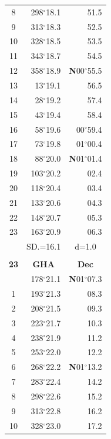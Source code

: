 \documentclass[10pt, a4paper]{report}
\begin{document}
\begin{scriptsize}
\begin{tabular*}{0.2\textwidth}[t]{@{\extracolsep{\fill}}|c|rr|}
8 & 298$^\circ$18.1 & 51.5\\
9 & 313$^\circ$18.3 & \raisebox{0.24ex}{\boldmath$\cdot$~\boldmath$\cdot$~~}52.5\\
10 & 328$^\circ$18.5 & 53.5\\
11 & 343$^\circ$18.7 & 54.5\\[2Pt]
12 & 358$^\circ$18.9 & \textbf{N}00$^\circ$55.5\\
13 & 13$^\circ$19.1 & 56.5\\
14 & 28$^\circ$19.2 & 57.4\\
15 & 43$^\circ$19.4 & \raisebox{0.24ex}{\boldmath$\cdot$~\boldmath$\cdot$~~}58.4\\
16 & 58$^\circ$19.6 & 00$^\circ$59.4\\
17 & 73$^\circ$19.8 & 01$^\circ$00.4\\[2Pt]
18 & 88$^\circ$20.0 & \textbf{N}01$^\circ$01.4\\
19 & 103$^\circ$20.2 & 02.4\\
20 & 118$^\circ$20.4 & 03.4\\
21 & 133$^\circ$20.6 & \raisebox{0.24ex}{\boldmath$\cdot$~\boldmath$\cdot$~~}04.3\\
22 & 148$^\circ$20.7 & 05.3\\
23 & 163$^\circ$20.9 & 06.3\\
\hline
\rule{0pt}{2.4ex} & \multicolumn{1}{c}{SD.=16.1} & \multicolumn{1}{c|}{d=1.0}\\
\hline
\multicolumn{1}{c}{}\\[-0.5ex]\hline
\multicolumn{1}{|c|}{\rule{0pt}{2.6ex}\textbf{23}} & \multicolumn{1}{c}{\textbf{GHA}} & \multicolumn{1}{c|}{\textbf{Dec}}\\
\hline\rule{0pt}{2.6ex}\noindent
0 & 178$^\circ$21.1 & \textbf{N}01$^\circ$07.3\\
1 & 193$^\circ$21.3 & 08.3\\
2 & 208$^\circ$21.5 & 09.3\\
3 & 223$^\circ$21.7 & \raisebox{0.24ex}{\boldmath$\cdot$~\boldmath$\cdot$~~}10.3\\
4 & 238$^\circ$21.9 & 11.2\\
5 & 253$^\circ$22.0 & 12.2\\[2Pt]
6 & 268$^\circ$22.2 & \textbf{N}01$^\circ$13.2\\
7 & 283$^\circ$22.4 & 14.2\\
8 & 298$^\circ$22.6 & 15.2\\
9 & 313$^\circ$22.8 & \raisebox{0.24ex}{\boldmath$\cdot$~\boldmath$\cdot$~~}16.2\\
10 & 328$^\circ$23.0 & 17.2\\

\end{tabular*}
\end{scriptsize}
\end{document}
